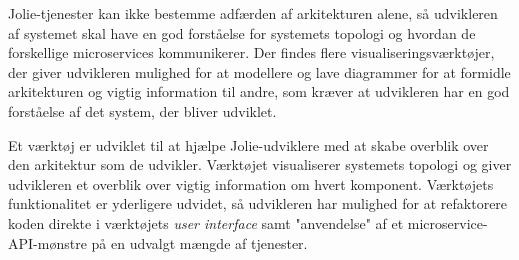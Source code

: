 Jolie-tjenester kan ikke bestemme adfærden af arkitekturen alene, så udvikleren af systemet skal have en god forståelse for systemets topologi og hvordan de forskellige microservices kommunikerer.
Der findes flere visualiseringsværktøjer, der giver udvikleren mulighed for at modellere og lave diagrammer for at formidle arkitekturen og vigtig information til andre,
som kræver at udvikleren har en god forståelse af det system, der bliver udviklet.

Et værktøj er udviklet til at hjælpe Jolie-udviklere med at skabe overblik over den arkitektur som de udvikler.
Værktøjet visualiserer systemets topologi og giver udvikleren et overblik over vigtig information om hvert komponent.
Værktøjets funktionalitet er yderligere udvidet, så udvikleren har mulighed for at refaktorere koden direkte i værktøjets \emph{user interface} samt "anvendelse" af et microservice-API-mønstre på en udvalgt mængde af tjenester.